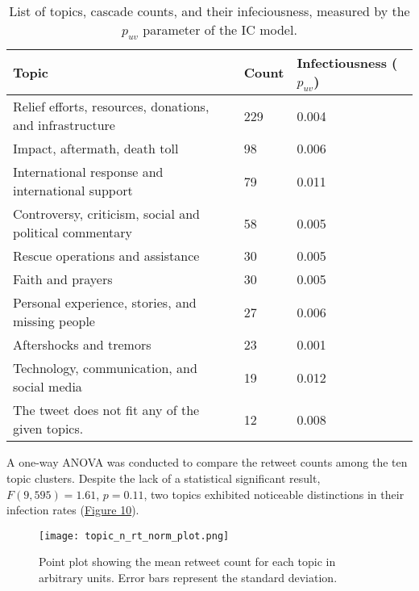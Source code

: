 \documentclass[11pt,a4paper]{article}
\begin{document}
        \begin{table}[h]
        \hypertarget{fig:topic-dist}{}
        \centering
        \begin{tabular}{|l|l|l|}
            \hline
            \textbf{Topic} & \textbf{Count} & \textbf{Infectiousness ($p_{uv}$)} \\
            \hline
            Relief efforts, resources, donations, and infrastructure & 229 & 0.004 \\
            Impact, aftermath, death toll & 98 & 0.006 \\
            International response and international support & 79 & 0.011 \\
            Controversy, criticism, social and political commentary & 58 & 0.005 \\
            Rescue operations and assistance & 30 & 0.005 \\
            Faith and prayers & 30 & 0.005 \\
            Personal experience, stories, and missing people & 27 & 0.006 \\
            Aftershocks and tremors & 23 & 0.001 \\
            Technology, communication, and social media & 19 & 0.012 \\
            The tweet does not fit any of the given topics. & 12 & 0.008 \\
            \hline
        \end{tabular}
        \caption{List of topics, cascade counts, and their infeciousness, measured by the $p_{uv}$ parameter of the IC model.}
        \end{table}
    
        A one-way ANOVA was conducted to compare the retweet counts among the ten topic clusters. Despite the lack of a statistical significant result, $F (9, 595) = 1.61$, $p = 0.11$, two topics exhibited noticeable distinctions in their infection rates (\hyperlink{fig:topic-comp}{Figure 10}). 
        
        \begin{figure}[H]
            \hypertarget{fig:topic-comp}{}
            \centering
            \texttt{[image: topic\_n\_rt\_norm\_plot.png]}\\
            \caption{Point plot showing the mean retweet count for each topic in arbitrary units. Error bars represent the standard deviation.}                    \label{fig:enter-label}
        \end{figure}
    
\end{document}
